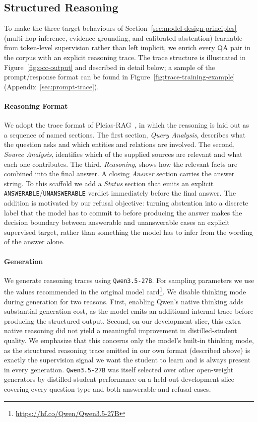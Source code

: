 \documentclass{llmxive}
\begin{document}
\subsection{Structured Reasoning}
\label{sec:synth-traces}

To make the three target behaviours of Section~\ref{sec:model-design-principles} (multi-hop inference, evidence grounding, and calibrated abstention) learnable from token-level supervision rather than left implicit, we enrich every QA pair in the corpus with an explicit reasoning trace. The trace structure is illustrated in Figure~\ref{fig:occ-output} and described in detail below; a sample of the prompt/response format can be found in Figure~\ref{fig:trace-training-example} (Appendix~\ref{sec:prompt-trace}).

\paragraph{Reasoning Format}
We adopt the trace format of Pleias-RAG~\citep{pleias}, in which the reasoning is laid out as a sequence of named sections. The first section, \emph{Query Analysis}, describes what the question asks and which entities and relations are involved. The second, \emph{Source Analysis}, identifies which of the supplied sources are relevant and what each one contributes. The third, \emph{Reasoning}, shows how the relevant facts are combined into the final answer. A closing \emph{Answer} section carries the answer string. To this scaffold we add a \emph{Status} section that emits an explicit \texttt{ANSWERABLE}/\texttt{UNANSWERABLE} verdict immediately before the final answer. The addition is motivated by our refusal objective: turning abstention into a discrete label that the model has to commit to before producing the answer makes the decision boundary between answerable and unanswerable cases an explicit supervised target, rather than something the model has to infer from the wording of the answer alone.

\paragraph{Generation}
We generate reasoning traces using \texttt{Qwen3.5-27B}. For sampling parameters we use the values recommended in the original model card\footnote{\url{https://hf.co/Qwen/Qwen3.5-27B}}. We disable thinking mode during generation for two reasons. First, enabling Qwen's native thinking adds substantial generation cost, as the model emits an additional internal trace before producing the structured output. Second, on our development slice, this extra native reasoning did not yield a meaningful improvement in distilled-student quality. We emphasize that this concerns only the model's built-in thinking mode, as the structured reasoning trace emitted in our own format (described above) is exactly the supervision signal we want the student to learn and is always present in every generation. \texttt{Qwen3.5-27B} was itself selected over other open-weight generators by distilled-student performance on a held-out development slice covering every question type and both answerable and refusal cases.
\end{document}
